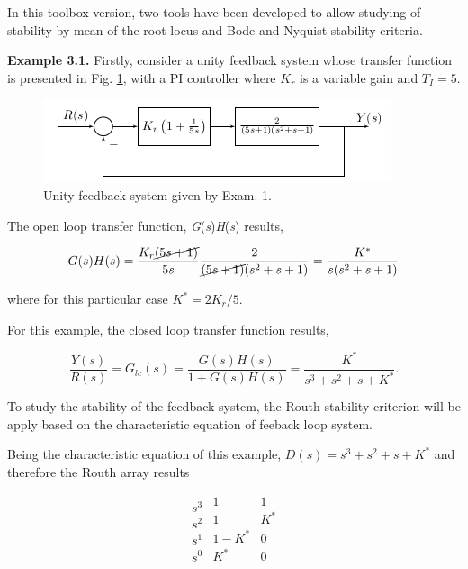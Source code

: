 In this toolbox version, two tools have been developed to allow studying of  stability by mean of the root locus and  Bode and Nyquist stability criteria.

\vspace{0.4cm}
\textbf{Example 3.1.} \label{ejem01_gh_oct}
Firstly, consider a unity feedback system whose transfer function is presented in Fig. \ref{fig01_ejem01_GH}, with a PI controller where $K_r$ is a variable gain and $T_I=5$. 
\begin{figure}[H]
	\centering
	\includegraphics[scale=1.2]{./figuras/chapter_glc/fig_GH_ejem01.png}
	\caption{Unity feedback system given by Exam. 1.}
	\label{fig01_ejem01_GH}
\end{figure}

The open loop transfer function, \textit{G}(\textit{s})\textit{H}(\textit{s}) results,

\begin{equation}\label{eqn01_ejem01_lc}
	G(s)H(s)=\frac{K_r\cancel{(5s+1)}}{5s}\frac{2}{\cancel{(5s+1)}(s^2+s+1)}=\frac{K^*}{s(s^2+s+1)}
\end{equation}

where for this particular case $K^*=2K_r/5$.

\vspace{0.4cm}
For this example, the closed loop transfer function results,

\begin{equation}\label{eqn02_ejem01_lc}
	\frac{Y(s)}{R(s)}=G_{lc}(s)=\frac{G(s)H(s)}{1+G(s)H(s)}=\frac{K^*}{s^3+s^2+s+K^*}.
\end{equation}

To study the stability of the feedback system,  the Routh stability criterion will be apply based on the characteristic equation of feeback loop system.

Being the characteristic equation of this example, $D(s)=s^3+s^2+s+K^*$ and therefore the Routh array results

\begin{equation*}
	\begin{array} {c|}
		s^3 \\ s^2 \\ s^1 \\ s^0
	\end{array}
	\begin{array} {cc}
		1  & 1 \\
		1  & K^* \\
		1-K^*  & 0  \\
		K^*  & 0 \\
	\end{array}
\end{equation*}

